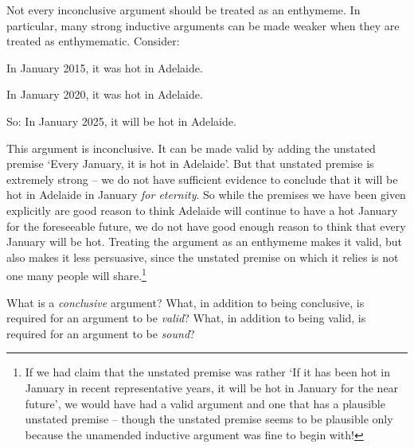 	Not every inconclusive argument should be treated as an enthymeme. In particular, many strong inductive arguments can be made weaker when they are treated as enthymematic. Consider:
	\begin{earg}
		\item[] In January 2015, it was hot in Adelaide.
		\item[] In January 2020, it was hot in Adelaide.
	\item[So:] In January 2025, it will be hot in Adelaide.
\end{earg} This argument is inconclusive. It can be made valid by adding the unstated premise `Every January, it is hot in Adelaide'. But that unstated premise is extremely strong – we do not have sufficient evidence to conclude that it will be hot in Adelaide in January \emph{for eternity}. So while the premises we have been given explicitly are good reason to think Adelaide will continue to have a hot January for the foreseeable future, we do not have good enough reason to think that every January will be hot. Treating the argument as an enthymeme makes it valid, but also makes it less persuasive, since the unstated premise on which it relies is not one many people will share.\footnote{If we had claim that the unstated premise was rather `If it has been hot in January in recent representative years, it will be hot in January for the near future', we would have had a valid argument and one that has a plausible unstated premise – though the unstated premise seems to be plausible only because the unamended inductive argument was fine to begin with!}


\practiceproblems
\problempart
What is a \emph{conclusive} argument? What, in addition to being conclusive, is required for an argument to be \emph{valid}? What, in addition to being valid, is required for an argument to be \emph{sound}?

